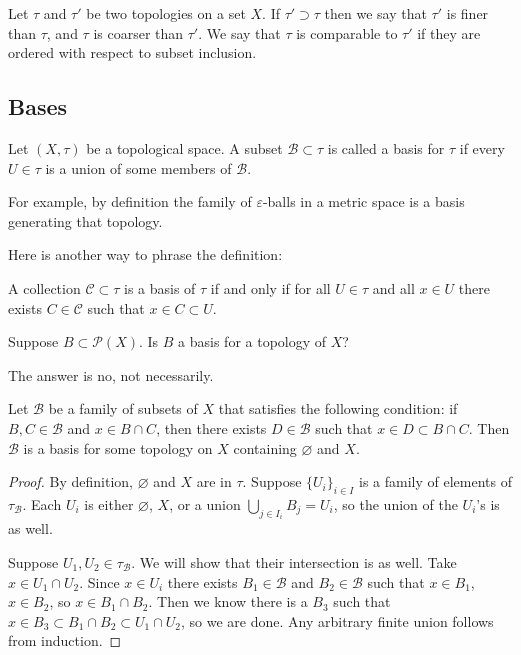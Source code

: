 \begin{definition}
Let $\tau$ and $\tau'$ be two topologies on a set $X$. If $\tau' \supset \tau$ then we say that $\tau'$ is finer than $\tau$, and $\tau$ is coarser than $\tau'$. We say that $\tau$ is comparable to $\tau'$ if they are ordered with respect to subset inclusion.
\end{definition}

\subsection{Bases}

\begin{definition}
Let $(X, \tau)$ be a topological space. A subset $\mathcal{B} \subset \tau$ is called a basis for $\tau$ if every $U \in \tau$ is a union of some members of $\mathcal{B}$. 
\end{definition}

For example, by definition the family of $\varepsilon$-balls in a metric space is a basis generating that topology.

Here is another way to phrase the definition:
\begin{definition}
A collection $\mathcal{C} \subset \tau$ is a basis of $\tau$ if and only if for all $U \in \tau$ and all $x \in U$ there exists $C \in \mathcal{C}$ such that $x \in C \subset U$.
\end{definition}

\begin{question}
Suppose $B \subset \mathcal{P}(X)$. Is $B$ a basis for a topology of $X$?
\end{question}

The answer is no, not necessarily.

\begin{theorem}
Let $\mathcal{B}$ be a family of subsets of $X$ that satisfies the following condition: if $B, C \in \mathcal{B}$ and $x \in B \cap C$, then there exists $D \in \mathcal{B}$ such that $x \in D \subset B \cap C$.
Then $\mathcal{B}$ is a basis for some topology on $X$ containing $\varnothing$ and $X$.
\end{theorem}

\begin{proof}
By definition, $\varnothing$ and $X$ are in $\tau$. Suppose $\{U_i\}_{i \in I}$ is a family of elements of $\tau_{\mathcal{B}}$. Each $U_i$ is either $\varnothing$, $X$, or a union $\bigcup_{j \in I_i}B_j = U_i$, so the union of the $U_i$'s is as well.

Suppose $U_1, U_2 \in \tau_{\mathcal{B}}$. We will show that their intersection is as well. Take $x \in U_1 \cap U_2$. Since $x \in U_i$ there exists $B_1 \in \mathcal{B}$ and $B_2 \in \mathcal{B}$ such that $x \in B_1$, $x \in B_2$, so $x \in B_1 \cap B_2$. Then we know there is a $B_3$ such that $x \in B_3 \subset B_1 \cap B_2 \subset U_1 \cap U_2$, so we are done. Any arbitrary finite union follows from induction.
\end{proof}


